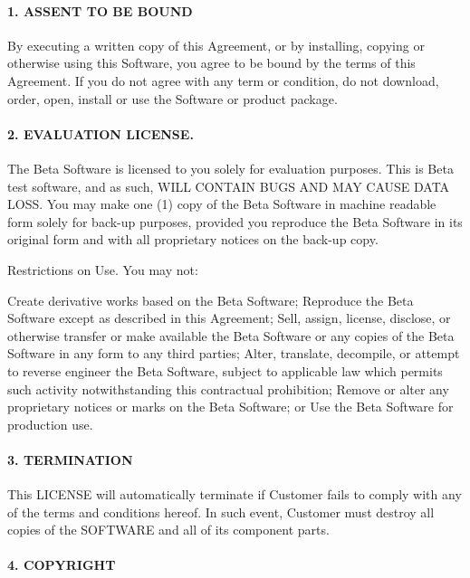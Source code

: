 \paragraph{1. ASSENT TO BE BOUND}

By executing a written copy of this Agreement, or by installing, copying or otherwise using this Software, you agree to be bound by the terms of this Agreement. If you do not agree with any term or condition, do not download, order, open, install or use the Software or product package.

\paragraph{2. EVALUATION LICENSE.}

The Beta Software is licensed to you solely for evaluation purposes. This is Beta test software, and as such, WILL CONTAIN BUGS AND MAY CAUSE DATA LOSS. You may make one (1) copy of the Beta Software in machine readable form solely for back-up purposes, provided you reproduce the Beta Software in its original form and with all proprietary notices on the back-up copy.

Restrictions on Use. You may not:

Create derivative works based on the Beta Software;
Reproduce the Beta Software except as described in this Agreement;
Sell, assign, license, disclose, or otherwise transfer or make available the Beta Software or any copies of the Beta Software in any form to any third parties;
Alter, translate, decompile, or attempt to reverse engineer the Beta Software, subject to applicable law which permits such activity notwithstanding this contractual prohibition;
Remove or alter any proprietary notices or marks on the Beta Software; or
Use the Beta Software for production use.

\paragraph{3. TERMINATION}

This LICENSE will automatically terminate if Customer fails to comply with any of the terms and conditions hereof. In such event, Customer must destroy all copies of the SOFTWARE and all of its component parts.

\paragraph{4. COPYRIGHT}

